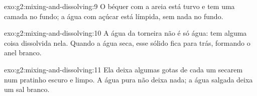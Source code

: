 \begin{solution}{exo:g2:mixing-and-dissolving:9}
O béquer com a areia está turvo e tem uma camada no fundo; a água com
açúcar está límpida, sem nada no fundo.
\end{solution}

\begin{solution}{exo:g2:mixing-and-dissolving:10}
A água da torneira não é só água: tem alguma coisa dissolvida nela.
Quando a água seca, esse sólido fica para trás, formando o anel branco.
\end{solution}

\begin{solution}{exo:g2:mixing-and-dissolving:11}
Ela deixa algumas gotas de cada um secarem num pratinho escuro e limpo.
A água pura não deixa nada; a água salgada deixa um sal branco.
\end{solution}
